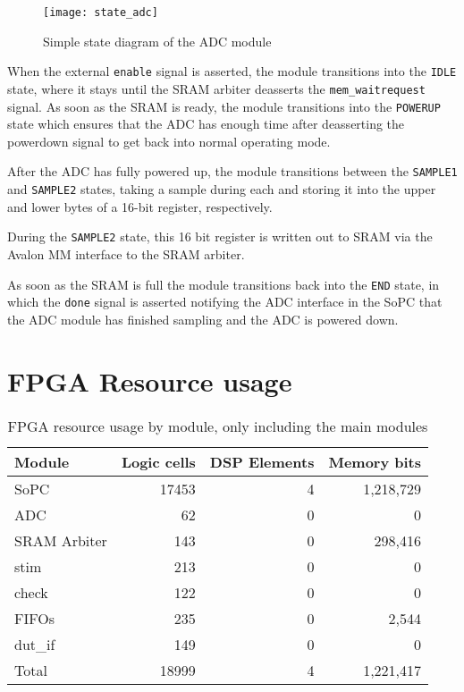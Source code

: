 \begin{figure}[h!]
\begin{center}
\texttt{[image: state\_adc]}
\caption{Simple state diagram of the ADC module}
\label{figure:state_adc}
\end{center}
\end{figure}

When the external \texttt{enable} signal is asserted, the module transitions into the
\texttt{IDLE} state, where it stays until the SRAM arbiter deasserts the \texttt{mem\_waitrequest}
signal. As soon as the SRAM is ready, the module transitions into the \texttt{POWERUP} state
which ensures that the ADC has enough time after deasserting the powerdown signal to
get back into normal operating mode.

After the ADC has fully powered up, the module transitions between the \texttt{SAMPLE1} and
\texttt{SAMPLE2} states, taking a sample during each and storing it into the upper and lower
bytes of a 16-bit register, respectively.

During the \texttt{SAMPLE2} state, this 16 bit register is written out to SRAM via the
Avalon MM interface to the SRAM arbiter.

As soon as the SRAM is full the module transitions back into the \texttt{END} state, in which
the \texttt{done} signal is asserted notifying the ADC interface in the SoPC that the ADC
module has finished sampling and the ADC is powered down.


\newpage
\section{FPGA Resource usage}
\begin{table}[h!]
\centering
\begin{tabular}{ | p{2cm} | r | r | r | }
 \hline
   Module & Logic cells & DSP Elements & Memory bits \\
 \hline
   SoPC & 17453 & 4 & 1,218,729 \\
 \hline
   ADC & 62 & 0 & 0\\
 \hline
   SRAM Arbiter & 143 & 0 & 298,416 \\
 \hline
   stim & 213 & 0 & 0 \\
 \hline
   check & 122 & 0 & 0 \\
 \hline
   FIFOs & 235 & 0 & 2,544 \\
 \hline
   dut\_if & 149 & 0 & 0 \\
 \hline
 \hline
   Total & 18999 & 4 & 1,221,417 \\
 \hline
\end{tabular}
\caption{FPGA resource usage by module, only including the main modules}
\label{table:resusage}
\end{table}
